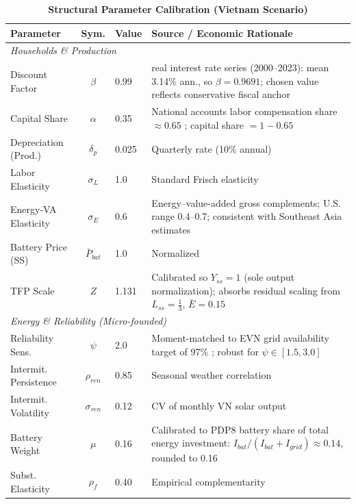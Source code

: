 \documentclass[12pt, a4paper]{article}
\begin{document}
	\begin{table}[H]
		\centering
		\caption{\textbf{Structural Parameter Calibration (Vietnam Scenario)}}
		\label{tab:calibration}
		\renewcommand{\arraystretch}{1.3}
		\small
		\begin{tabular}{l c l p{6.5cm}}
			\toprule
			\textbf{Parameter} & \textbf{Sym.} & \textbf{Value} & \textbf{Source / Economic Rationale} \\
			\midrule
			\multicolumn{4}{l}{\textit{Households \& Production}} \\
			Discount Factor & $\beta$ & 0.99 & \citep{worldbank2024} real interest rate series (2000--2023): mean 3.14\% ann., so $\beta = 0.9691$; chosen value reflects conservative fiscal anchor \\
			Capital Share & $\alpha$ & 0.35 & National accounts labor compensation share $\approx 0.65$ \citep{gso2024}; capital share $= 1 - 0.65$ \\
			Depreciation (Prod.) & $\delta_p$ & 0.025 & Quarterly rate (10\% annual) \\
			Labor Elasticity & $\sigma_L$ & 1.0 & Standard Frisch elasticity \\
			Energy-VA Elasticity & $\sigma_E$ & 0.6 & Energy--value-added gross complements; \citep{heutel2012} U.S. range 0.4--0.7; consistent with \citep{iea2023} Southeast Asia estimates \\
			Battery Price (SS) & $\bar{P}_{bat}$ & 1.0 & Normalized \\
			TFP Scale & $Z$ & 1.131 & Calibrated so $Y_{ss}=1$ (sole output normalization); absorbs residual scaling from $L_{ss}=\tfrac{1}{3}$, $\bar{E}=0.15$ \\
			\midrule
			\multicolumn{4}{l}{\textit{Energy \& Reliability (Micro-founded)}} \\
			Reliability Sens. & $\psi$ & 2.0 & Moment-matched to EVN grid availability target of 97\% \citep{evn2023}; robust for $\psi \in [1.5, 3.0]$ \\
			Intermit. Persistence & $\rho_{ren}$ & 0.85 & Seasonal weather correlation \citep{iea2023} \\
			Intermit. Volatility & $\sigma_{ren}$ & 0.12 & CV of monthly VN solar output \citep{gso2024,iea2023} \\
			Battery Weight & $\mu$ & 0.16 & Calibrated to PDP8 battery share of total energy investment: $I_{bat}/(I_{bat}+I_{grid}) \approx 0.14$, rounded to 0.16 \\
			Subst. Elasticity & $\rho_f$ & 0.40 & Empirical complementarity \citep{hart2019} \\

\end{tabular}
\end{table}
\end{document}
